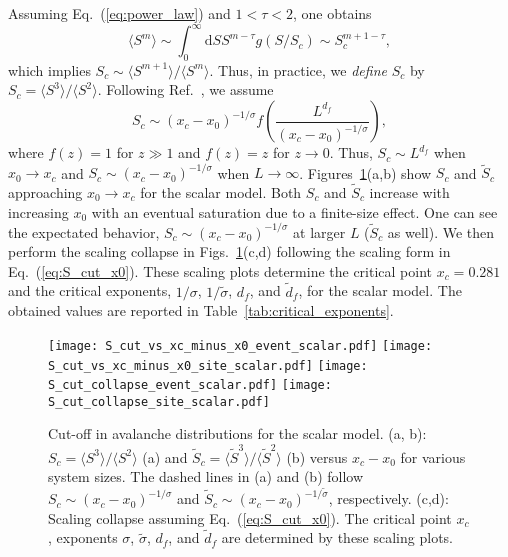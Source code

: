 \documentclass[pre,twocolumn,superscriptaddress,tightenlines,showpacs,longbibliography,floatfix,footinbib]{revtex4-1}
\begin{document}
Assuming Eq.~(\ref{eq:power_law}) and $1<\tau<2$, one obtains
\begin{equation}
    \langle S^m \rangle \sim \int_0^{\infty} \mathrm{d}S S^{m-\tau} g(S/S_c) \sim S_c^{m+1-\tau},
\end{equation}
which implies $S_c \sim \langle S^{m+1} \rangle/\langle S^m \rangle$. Thus, in practice, we {\it define} $S_c$ by $S_c = \langle S^3 \rangle/\langle S^2 \rangle$.
Following Ref.~\cite{han2018critical}, we assume
\begin{equation}
    S_c \sim (x_c-x_0)^{-1/\sigma}f\left( \frac{L^{d_f}}{(x_c-x_0)^{-1/\sigma}}\right),
    \label{eq:S_cut_x0}
\end{equation}
where $f(z) = 1$ for $z \gg 1$ and $f(z)=z$ for $z \to 0$.
Thus, $S_c \sim L^{d_f}$ when $x_0 \to x_c$ and $S_c \sim (x_c-x_0)^{-1/\sigma}$ when $L \to \infty$.
Figures~\ref{fig:S_c_scalar}(a,b) show $S_c$ and $\tilde S_c$ approaching $x_0 \to x_c$ for the scalar model.
Both $S_c$ and $\tilde S_c$ increase with increasing $x_0$ with an eventual saturation due to a finite-size effect. One can see the expectated behavior, $S_c \sim (x_c-x_0)^{-1/\sigma}$ at larger $L$ ($\tilde S_c$ as well). 
We then perform the scaling collapse in Figs.~\ref{fig:S_c_scalar}(c,d) following the scaling form in Eq.~(\ref{eq:S_cut_x0}).
These scaling plots determine the critical point $x_c=0.281$ and the critical exponents, $1/\sigma$, $1/\tilde \sigma$, $d_f$, and $\tilde d_f$, for the scalar model.
The obtained values are reported in Table~\ref{tab:critical_exponents}.
\begin{figure}
\centering
\texttt{[image: S\_cut\_vs\_xc\_minus\_x0\_event\_scalar.pdf]}
\texttt{[image: S\_cut\_vs\_xc\_minus\_x0\_site\_scalar.pdf]}
\texttt{[image: S\_cut\_collapse\_event\_scalar.pdf]}
\texttt{[image: S\_cut\_collapse\_site\_scalar.pdf]}
\caption{Cut-off in avalanche distributions for the scalar model. (a, b): $S_c=\langle S^3 \rangle/\langle S^2 \rangle$ (a) and $\tilde S_c = \langle \tilde S^3 \rangle/\langle \tilde S^2 \rangle$ (b) versus $x_c-x_0$ for various system sizes. The dashed lines in (a) and (b) follow $S_c \sim (x_c-x_0)^{-1/\sigma}$ and $\tilde S_c \sim (x_c-x_0)^{-1/\tilde  \sigma}$, respectively.
(c,d): Scaling collapse assuming Eq.~(\ref{eq:S_cut_x0}).
The critical point $x_c$, exponents $\sigma$, $\tilde \sigma$, $d_f$, and $\tilde d_f$ are determined by these scaling plots.}
\label{fig:S_c_scalar}
\end{figure}
\end{document}
